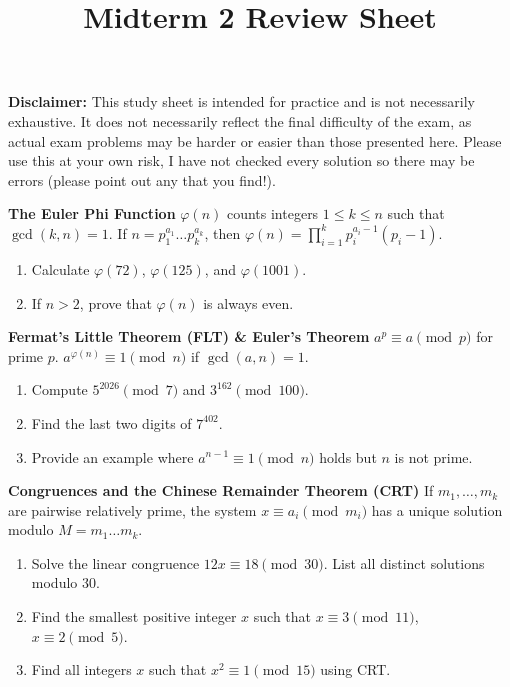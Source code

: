 \documentclass[12pt]{article}
\begin{document}
\title{Midterm 2 Review Sheet}
\date{}
\maketitle


\textbf{Disclaimer:} This study sheet is intended for practice and is not necessarily exhaustive. It does not necessarily reflect the final difficulty of the exam, as actual exam problems may be harder or easier than those presented here. Please use this at your own risk, I have not checked every solution so there may be errors (please point out any that you find!).   

\textbf{The Euler Phi Function}
$\varphi(n)$ counts integers $1 \le k \le n$ such that $\gcd(k, n) = 1$. If $n = p_1^{a_1} \dots p_k^{a_k}$, then $\varphi(n) = \prod_{i = 1}^k p_i^{a_i - 1}(p_i - 1)$.

\begin{enumerate}
    \item Calculate $\varphi(72)$, $\varphi(125)$, and $\varphi(1001)$.
    \item If $n > 2$, prove that $\varphi(n)$ is always even.
\end{enumerate}

\textbf{ Fermat's Little Theorem (FLT) \& Euler's Theorem}
$a^p \equiv a \pmod{p}$ for prime $p$. $a^{\varphi(n)} \equiv 1 \pmod{n}$ if $\gcd(a, n) = 1$.

\begin{enumerate}
    \item Compute $5^{2026} \pmod{7}$ and $3^{162} \pmod{100}$.
    \item Find the last two digits of $7^{402}$.
    \item Provide an example where $a^{n-1} \equiv 1 \pmod{n}$ holds but $n$ is not prime.
\end{enumerate}

\textbf{Congruences and the Chinese Remainder Theorem (CRT)}
If $m_1, \dots, m_k$ are pairwise relatively prime, the system $x \equiv a_i \pmod{m_i}$ has a unique solution modulo $M = m_1 \dots m_k$.

\begin{enumerate}
    \item Solve the linear congruence $12x \equiv 18 \pmod{30}$. List all distinct solutions modulo 30.
    \item Find the smallest positive integer $x$ such that $x \equiv 3 \pmod{11}$, $x \equiv 2 \pmod{5}$.
    \item Find all integers $x$ such that $x^2 \equiv 1 \pmod{15}$ using CRT.
\end{enumerate}
\end{document}
